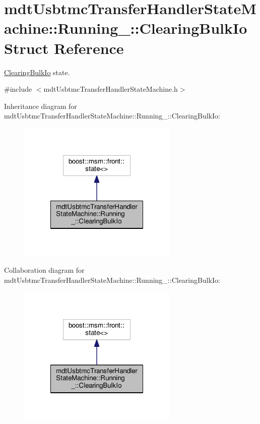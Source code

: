 \hypertarget{structmdt_usbtmc_transfer_handler_state_machine_1_1_running___1_1_clearing_bulk_io}{\section{mdt\-Usbtmc\-Transfer\-Handler\-State\-Machine\-:\-:Running\-\_\-\-:\-:Clearing\-Bulk\-Io Struct Reference}
\label{structmdt_usbtmc_transfer_handler_state_machine_1_1_running___1_1_clearing_bulk_io}
}


\hyperlink{structmdt_usbtmc_transfer_handler_state_machine_1_1_running___1_1_clearing_bulk_io}{Clearing\-Bulk\-Io} state.  




{\ttfamily \#include $<$mdt\-Usbtmc\-Transfer\-Handler\-State\-Machine.\-h$>$}



Inheritance diagram for mdt\-Usbtmc\-Transfer\-Handler\-State\-Machine\-:\-:Running\-\_\-\-:\-:Clearing\-Bulk\-Io\-:
\nopagebreak
\begin{figure}[H]
\begin{center}
\leavevmode
\includegraphics[width=216pt]{structmdt_usbtmc_transfer_handler_state_machine_1_1_running___1_1_clearing_bulk_io__inherit__graph}
\end{center}
\end{figure}


Collaboration diagram for mdt\-Usbtmc\-Transfer\-Handler\-State\-Machine\-:\-:Running\-\_\-\-:\-:Clearing\-Bulk\-Io\-:
\nopagebreak
\begin{figure}[H]
\begin{center}
\leavevmode
\includegraphics[width=216pt]{structmdt_usbtmc_transfer_handler_state_machine_1_1_running___1_1_clearing_bulk_io__coll__graph}
\end{center}
\end{figure}

